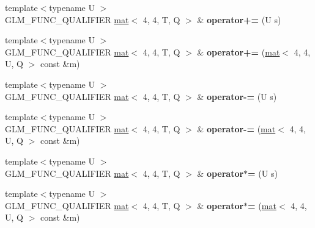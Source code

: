 \begin{DoxyCompactItemize}
{\footnotesize template$<$typename U $>$ }\\G\+L\+M\+\_\+\+F\+U\+N\+C\+\_\+\+Q\+U\+A\+L\+I\+F\+I\+ER \hyperlink{structglm_1_1mat}{mat}$<$ 4, 4, T, Q $>$ \& {\bfseries operator+=} (U s)
\item 
\mbox{\label{structglm_1_1mat_3_014_00_014_00_01T_00_01Q_01_4_a408fc5e603bd8cabac8c493c57533821}} 
{\footnotesize template$<$typename U $>$ }\\G\+L\+M\+\_\+\+F\+U\+N\+C\+\_\+\+Q\+U\+A\+L\+I\+F\+I\+ER \hyperlink{structglm_1_1mat}{mat}$<$ 4, 4, T, Q $>$ \& {\bfseries operator+=} (\hyperlink{structglm_1_1mat}{mat}$<$ 4, 4, U, Q $>$ const \&m)
\item 
\mbox{\label{structglm_1_1mat_3_014_00_014_00_01T_00_01Q_01_4_aecbd6fe73f2df0690098bbfadc48863d}} 
{\footnotesize template$<$typename U $>$ }\\G\+L\+M\+\_\+\+F\+U\+N\+C\+\_\+\+Q\+U\+A\+L\+I\+F\+I\+ER \hyperlink{structglm_1_1mat}{mat}$<$ 4, 4, T, Q $>$ \& {\bfseries operator-\/=} (U s)
\item 
\mbox{\label{structglm_1_1mat_3_014_00_014_00_01T_00_01Q_01_4_aefa852deacee364e0a9526f829ddf85a}} 
{\footnotesize template$<$typename U $>$ }\\G\+L\+M\+\_\+\+F\+U\+N\+C\+\_\+\+Q\+U\+A\+L\+I\+F\+I\+ER \hyperlink{structglm_1_1mat}{mat}$<$ 4, 4, T, Q $>$ \& {\bfseries operator-\/=} (\hyperlink{structglm_1_1mat}{mat}$<$ 4, 4, U, Q $>$ const \&m)
\item 
\mbox{\label{structglm_1_1mat_3_014_00_014_00_01T_00_01Q_01_4_a9bf5d9e348d7f5ebc4945e96afe9e2f1}} 
{\footnotesize template$<$typename U $>$ }\\G\+L\+M\+\_\+\+F\+U\+N\+C\+\_\+\+Q\+U\+A\+L\+I\+F\+I\+ER \hyperlink{structglm_1_1mat}{mat}$<$ 4, 4, T, Q $>$ \& {\bfseries operator$\ast$=} (U s)
\item 
\mbox{\label{structglm_1_1mat_3_014_00_014_00_01T_00_01Q_01_4_aa2dcaab7e49dd355e77e8dba78946669}} 
{\footnotesize template$<$typename U $>$ }\\G\+L\+M\+\_\+\+F\+U\+N\+C\+\_\+\+Q\+U\+A\+L\+I\+F\+I\+ER \hyperlink{structglm_1_1mat}{mat}$<$ 4, 4, T, Q $>$ \& {\bfseries operator$\ast$=} (\hyperlink{structglm_1_1mat}{mat}$<$ 4, 4, U, Q $>$ const \&m)

\end{DoxyCompactItemize}
